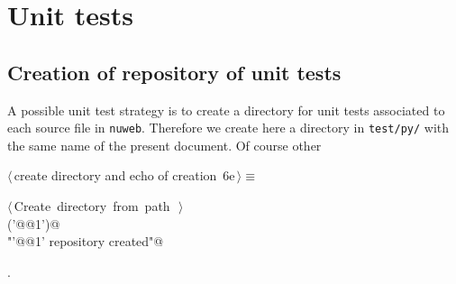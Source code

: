 \documentclass[11pt,oneside]{article}	%
\begin{document}
\section{Unit tests}

\subsection{Creation of repository of unit tests}

A possible unit test strategy is to create a directory for unit tests associated to each source file in \texttt{nuweb}. Therefore we create here a directory in \texttt{test/py/} with the same name of the present document. Of course other 

\begin{flushleft} \small
\begin{minipage}{\linewidth} \label{scrap18}
\protect{}$\langle\,$create directory and echo of creation\nobreak\ {\footnotesize 6e}$\,\rangle\equiv$
\vspace{-1ex}
\begin{list}{}{} \item
\mbox{}\verb@@\hbox{$\langle\,$Create directory from path\nobreak\ {\footnotesize {}}$\,\rangle$}\verb@@\\
\mbox{}\verb@createDir('@@1\verb@')@\\
\mbox{}\verb@print "'@@1\verb@' repository created"@\\
\mbox{}\verb@@{\NWsep}
\end{list}
\vspace{-1ex}
\footnotesize\addtolength{\baselineskip}{-1ex}
\begin{list}{}{\setlength{\itemsep}{-\parsep}\setlength{\itemindent}{-\leftmargin}}
\item {\NWtxtMacroNoRef}.
\end{list}
\end{minipage}\\[4ex]
\end{flushleft}
\end{document}
